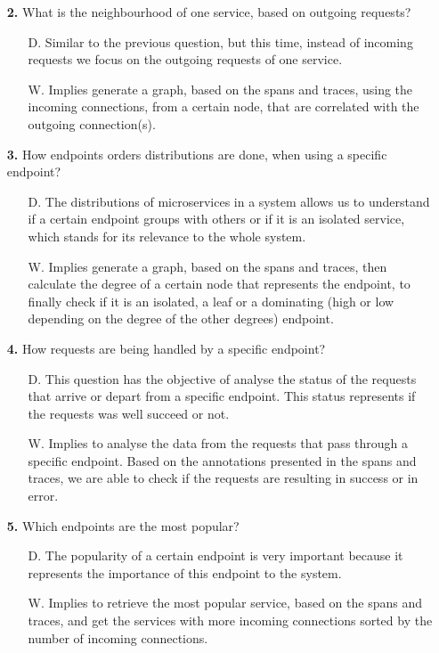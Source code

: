 \begin{enumerate}
\begin{itemize}
    \item[\textbf{2.}] What is the neighbourhood of one service, based on outgoing requests?
    \begin{itemize}
        \item[D.] Similar to the previous question, but this time, instead of incoming requests we focus on the outgoing requests of one service. 
        \item[W.] Implies generate a graph, based on the spans and traces, using the incoming connections, from a certain node, that are correlated with the outgoing connection(s).
    \end{itemize}

    \item[\textbf{3.}] How endpoints orders distributions are done, when using a specific endpoint?
    \begin{itemize}
        \item[D.] The distributions of microservices in a system allows us to understand if a certain endpoint groups with others or if it is an isolated service, which stands for its relevance to the whole system.
        \item[W.] Implies generate a graph, based on the spans and traces, then calculate the degree of a certain node that represents the endpoint, to finally check if it is an isolated, a leaf or a dominating (high or low depending on the degree of the other degrees) endpoint.
    \end{itemize}
    
    \item[\textbf{4.}] How requests are being handled by a specific endpoint?
    \begin{itemize}
        \item[D.] This question has the objective of analyse the status of the requests that arrive or depart from a specific endpoint. This status represents if the requests was well succeed or not.
        \item[W.] Implies to analyse the data from the requests that pass through a specific endpoint. Based on the annotations presented in the spans and traces, we are able to check if the requests are resulting in success or in error. 
    \end{itemize}

    \item[\textbf{5.}] Which endpoints are the most popular?
    \begin{itemize}
        \item[D.] The popularity of a certain endpoint is very important because it represents the importance of this endpoint to the system.
        \item[W.] Implies to retrieve the most popular service, based on the spans and traces, and get the services with more incoming connections sorted by the number of incoming connections.
    \end{itemize}


\end{itemize}
\end{enumerate}
